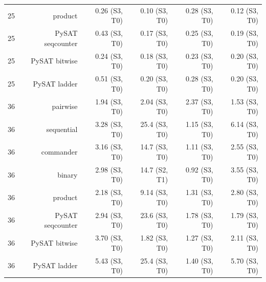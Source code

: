\begin{tabular}{lrrrrr}
25 & product & 0.26 (S3, T0) & 0.10 (S3, T0) & 0.28 (S3, T0) & 0.12 (S3, T0) \\
25 & PySAT seqcounter & 0.43 (S3, T0) & 0.17 (S3, T0) & 0.25 (S3, T0) & 0.19 (S3, T0) \\
25 & PySAT bitwise & 0.24 (S3, T0) & 0.18 (S3, T0) & 0.23 (S3, T0) & 0.20 (S3, T0) \\
25 & PySAT ladder & 0.51 (S3, T0) & 0.20 (S3, T0) & 0.28 (S3, T0) & 0.20 (S3, T0) \\
36 & pairwise & 1.94 (S3, T0) & 2.04 (S3, T0) & 2.37 (S3, T0) & 1.53 (S3, T0) \\
36 & sequential & 3.28 (S3, T0) & 25.4 (S3, T0) & 1.15 (S3, T0) & 6.14 (S3, T0) \\
36 & commander & 3.16 (S3, T0) & 14.7 (S3, T0) & 1.11 (S3, T0) & 2.55 (S3, T0) \\
36 & binary & 2.98 (S3, T0) & 14.7 (S2, T1) & 0.92 (S3, T0) & 3.55 (S3, T0) \\
36 & product & 2.18 (S3, T0) & 9.14 (S3, T0) & 1.31 (S3, T0) & 2.80 (S3, T0) \\
36 & PySAT seqcounter & 2.94 (S3, T0) & 23.6 (S3, T0) & 1.78 (S3, T0) & 1.79 (S3, T0) \\
36 & PySAT bitwise & 3.70 (S3, T0) & 1.82 (S3, T0) & 1.27 (S3, T0) & 2.11 (S3, T0) \\
36 & PySAT ladder & 5.43 (S3, T0) & 25.4 (S3, T0) & 1.40 (S3, T0) & 5.70 (S3, T0) \\
\bottomrule
\end{tabular}
